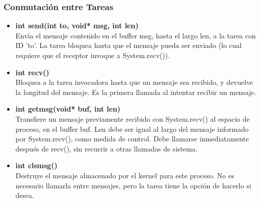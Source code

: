 \documentclass[a4paper,10pt]{article}
\begin{document}
\subsubsection{Conmutación entre Tareas}
\begin{itemize}
 \item \textbf{int send(int to, void* msg, int len)}\\
  \noindent Envía el mensaje contenido en el buffer msg, hasta el largo len, a la tarea con ID 'to'. La tarea bloquea hasta que el mensaje pueda ser enviado (lo cual requiere que el receptor invoque a System.recv()).
 \item \textbf{int recv()}\\
  \noindent Bloquea a la tarea invocadora hasta que un mensaje sea recibido, y devuelve la longitud del mensaje. Es la primera llamada al intentar recibir un mensaje.
 \item \textbf{int getmsg(void* buf, int len)}\\
  \noindent Transfiere un mensaje previamente recibido con System.recv() al espacio de proceso, en el buffer buf. Len debe ser igual al largo del mensaje informado por System.recv(), como medida de control. Debe llamarse inmediatamente después de recv(), sin recurrir a otras llamadas de sistema.
 \item \textbf{int clsmsg()}\\
  \noindent Destruye el mensaje almacenado por el kernel para este proceso. No es necesario llamarla entre mensajes, pero la tarea tiene la opción de hacerlo si desea.
\end{itemize}
\end{document}
